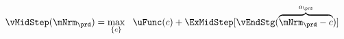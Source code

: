   \begin{equation}\begin{gathered}\begin{aligned}
        \vMidStep(\mNrm_{\prd}) & = \max_{\{{c}\}}~~\uFunc({c}) +\ExMidStep[ \vEndStg(\overbrace{\mNrm_{\prd}-{c}}^{a_{\prd}})] \label{eq:vMidStep}
      \end{aligned}\end{gathered}\end{equation}
